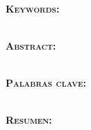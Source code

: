 % 
% 
% 

\newpage
\thispagestyle{empty}

\clearpage
\cleardoublepage
{}

\pagestyle{plain}



{}

{\noindent \large \textbf{\thesisTitle}}\\

{\noindent \textbf{\textsc{Keywords:}}}

{\noindent \thesisKeywords}\\

{\noindent \textbf{\textsc{Abstract:}}}

\noindent \lipsum[4-7]




\newpage
\thispagestyle{empty}

\clearpage
\cleardoublepage
{}

\pagestyle{plain}

{\noindent \large \textbf{\thesisTitle}}\\

{\noindent \textbf{\textsc{Palabras clave:}}}

{\noindent \thesisKeywords}\\


{\noindent \textbf{\textsc{Resumen:}}}

\noindent \lipsum[8-12]

